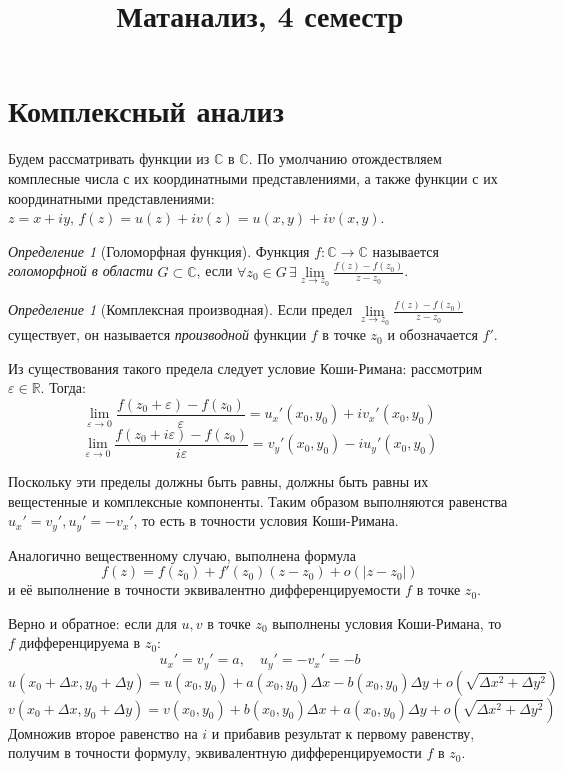 \documentclass[12pt]{article}
\newcommand{\R}{\mathbb{R}}
\renewcommand{\C}{\mathbb{C}}
\newcounter{cnt}
\theoremstyle{thmnote}
\theoremstyle{remark}
\theoremstyle{defnote}
\newtheorem{definition}[cnt]{Определение}
\begin{document}
\title{Матанализ, 4 семестр}
\author{}
\date{}
\maketitle

\section*{Комплексный анализ}

Будем рассматривать функции из $\C$ в $\C$. По умолчанию отождествляем комплесные числа с их координатными представлениями, а также функции с их координатными представлениями: $z = x + iy,\, f(z) = u(z) + i v(z) = u(x, y) + i v(x, y)$.

\begin{definition}[Голоморфная функция]
    Функция $f: \C \to \C$ называется \textit{голоморфной в области} $G \subset \C$, если $\forall z_0 \in G \,\exists \underset{z \to z_0}{\lim} \frac{f(z) - f(z_0)}{z - z_0}$.
\end{definition}

\begin{definition}[Комплексная производная]
    Если предел $\underset{z \to z_0}{\lim} \frac{f(z) - f(z_0)}{z - z_0}$ существует, он называется \textit{производной} функции $f$ в точке $z_0$ и обозначается $f'$.
\end{definition}

Из существования такого предела следует условие Коши-Римана: рассмотрим $\varepsilon \in \R$. Тогда:
\[
    \underset{\varepsilon \to 0}{\lim} \frac{f(z_0 + \varepsilon) - f(z_0)}{\varepsilon} = u_x'(x_0, y_0) + i v_x'(x_0, y_0)
\]
\[
    \underset{\varepsilon \to 0}{\lim} \frac{f(z_0 + i \varepsilon) - f(z_0)}{i \varepsilon} = v_y'(x_0, y_0) - i u_y'(x_0, y_0)
\]

Поскольку эти пределы должны быть равны, должны быть равны их вещестенные и комплексные компоненты. Таким образом выполняются равенства $u_x' = v_y', u_y' = -v_x'$, то есть в точности условия Коши-Римана.

Аналогично вещественному случаю, выполнена формула
\[
    f(z) = f(z_0) + f'(z_0)(z - z_0) + o(|z - z_0|)
\]
и её выполнение в точности эквивалентно дифференцируемости $f$ в точке $z_0$.

Верно и обратное: если для $u, v$ в точке $z_0$ выполнены условия Коши-Римана, то $f$ дифференцируема в $z_0$:
\[
    u_x' = v_y' = a, \quad u_y' = -v_x' = -b
\]
\[
    u(x_0 + \Delta x, y_0 + \Delta y) = u(x_0, y_0) + a(x_0, y_0) \Delta x - b(x_0, y_0) \Delta y + o(\sqrt{\Delta x^2 + \Delta y^2})
\]
\[
    v(x_0 + \Delta x, y_0 + \Delta y) = v(x_0, y_0) + b(x_0, y_0) \Delta x + a(x_0, y_0) \Delta y + o(\sqrt{\Delta x^2 + \Delta y^2})
\]
Домножив второе равенство на $i$ и прибавив результат к первому равенству, получим в точности формулу, эквивалентную дифференцируемости $f$ в $z_0$.
\end{document}
